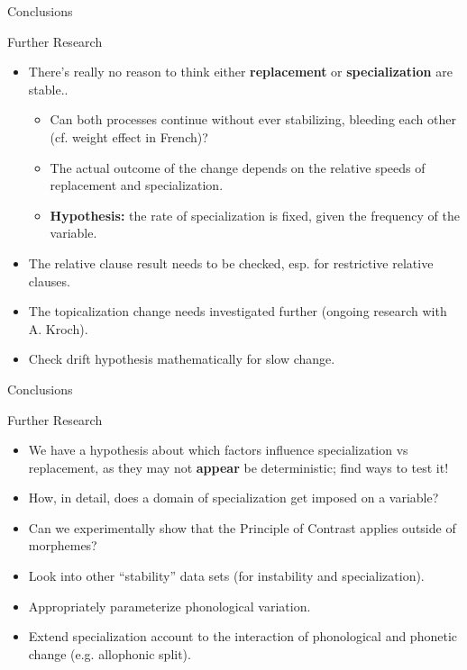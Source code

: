 \documentclass[hyperref={pdfpagelabels=false}]{beamer}
\begin{document}
\begin{frame}{Conclusions}
	\begin{block}{Further Research}
		\begin{itemize}
			\item There's really no reason to think either \textbf{replacement} or \textbf{specialization} are stable..
				\begin{itemize}
					\item Can both processes continue without ever stabilizing, bleeding each other (cf. weight effect in French)?
					\item The actual outcome of the change depends on the relative speeds of replacement and specialization.
					\item \textbf{Hypothesis:} the rate of specialization is fixed, given the frequency of the variable.

				\end{itemize}
			\item The relative clause result needs to be checked, esp. for restrictive relative clauses.
			\item The topicalization change needs investigated further (ongoing research with A. Kroch).
			\item Check drift hypothesis mathematically for slow change.
				\end{itemize}
	\end{block}
\end{frame}

\begin{frame}{Conclusions}
	\begin{block}{Further Research}
		\begin{itemize}
			\item We have a hypothesis about which factors influence specialization vs replacement, as they may not \textbf{appear} be deterministic; find ways to test it!
			\item How, in detail, does a domain of specialization get imposed on a variable?
			\item Can we experimentally show that the Principle of Contrast applies outside of morphemes?
			\item Look into other ``stability'' data sets (for instability and specialization).
			\item Appropriately parameterize phonological variation.
			\item Extend specialization account to the interaction of phonological and phonetic change (e.g. allophonic split).
		\end{itemize}
	\end{block}

\end{frame}
\end{document}
